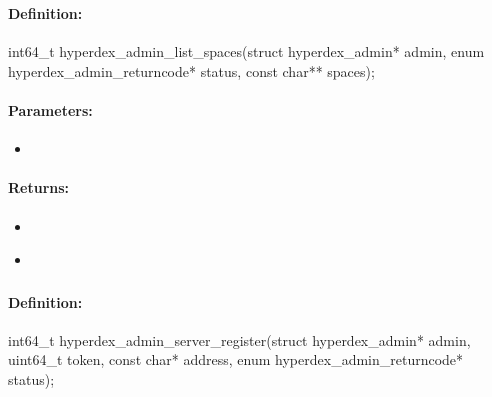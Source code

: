 \pagebreak
\subsubsection{}
\label{api:c:list_spaces}


\paragraph{Definition:}
\begin{ccode}
int64_t hyperdex_admin_list_spaces(struct hyperdex_admin* admin,
        enum hyperdex_admin_returncode* status,
        const char** spaces);
\end{ccode}

\paragraph{Parameters:}
\begin{itemize}[noitemsep]
\item {}\\

\end{itemize}

\paragraph{Returns:}
\begin{itemize}[noitemsep]
\item {}\\

\item {}\\

\end{itemize}

\pagebreak
\subsubsection{}
\label{api:c:server_register}


\paragraph{Definition:}
\begin{ccode}
int64_t hyperdex_admin_server_register(struct hyperdex_admin* admin,
        uint64_t token,
        const char* address,
        enum hyperdex_admin_returncode* status);
\end{ccode}


